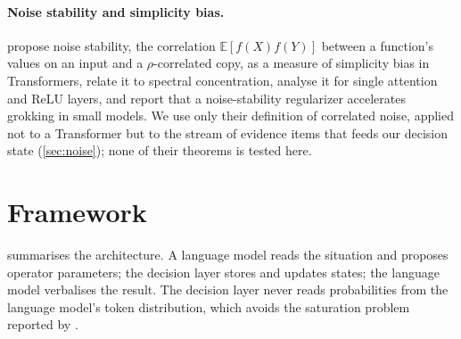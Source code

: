 \documentclass[11pt]{article}
\theoremstyle{definition}
\theoremstyle{remark}
\begin{document}
\paragraph{Noise stability and simplicity bias.} \citet{haris2026noise} propose noise stability, the correlation $\mathbb{E}[f(X)f(Y)]$ between a function's values on an input and a $\rho$-correlated copy, as a measure of simplicity bias in Transformers, relate it to spectral concentration, analyse it for single attention and ReLU layers, and report that a noise-stability regularizer accelerates grokking in small models. We use only their definition of correlated noise, applied not to a Transformer but to the stream of evidence items that feeds our decision state (\cref{sec:noise}); none of their theorems is tested here.

\section{Framework}
\label{sec:framework}

 summarises the architecture. A language model reads the situation and proposes operator parameters; the decision layer stores and updates states; the language model verbalises the result. The decision layer never reads probabilities from the language model's token distribution, which avoids the saturation problem reported by \citet{kang2026}.
\end{document}
